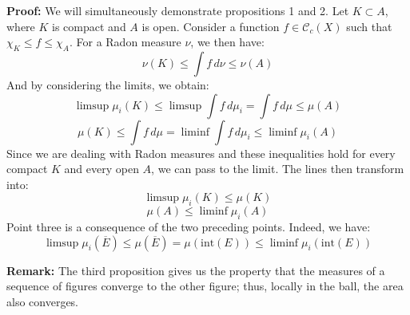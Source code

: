 \vspace{1ex}
\textbf{Proof:} We will simultaneously demonstrate propositions 1 and 2. Let $K \subset A$,
where $K$ is compact and $A$ is open. Consider a function $f\in\mathcal{C}
_c(X)$ such that $\chi_K\leq f\leq\chi_A$. For a Radon measure $\nu$, we then have:
\[\nu(K) \leq \int f \,d\nu \leq \nu(A)\]
And by considering the limits, we obtain:
\[\limsup \mu_i(K) \leq \limsup \int f \,d\mu_i = \int f \,d\mu \leq \mu(A)\]
\[\mu(K) \leq \int f \,d\mu = \liminf \int f \,d\mu_i \leq \liminf \mu_i(A)\]
Since we are dealing with Radon measures and these inequalities hold for
every compact $K$ and every open $A$, we can pass to the limit. The
lines then transform into:
\[\limsup \mu_i(K) \leq \mu(K)\]
\[\mu(A) \leq \liminf \mu_i(A)\]
Point three is a consequence of the two preceding points. Indeed, we have:
\[\limsup\mu_i(\overline E)\leq\mu(\overline E)=\mu(\text{int}(E))\leq\liminf\mu_i(\text{int}(E))\]

\vspace{2ex}
\textbf{Remark:} The third proposition gives us the property that the
measures of a sequence of figures converge to the other figure; thus,
locally in the ball, the area also converges.
